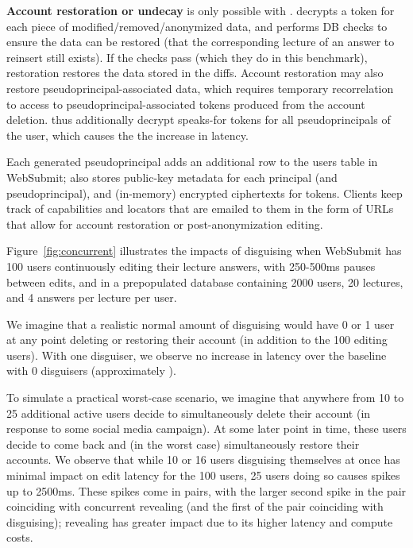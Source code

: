 \textbf{Account restoration or undecay} is only possible with \sys. \sys decrypts a token for each
piece of modified/removed/anonymized data, and performs DB checks to ensure the data can be restored
(\eg that the corresponding lecture of an answer to reinsert still exists). If the checks pass
(which they do in this benchmark), restoration restores the data stored in the diffs. Account
restoration may also restore pseudoprincipal-associated data, which requires temporary recorrelation
to access to pseudoprincipal-associated tokens produced from the account deletion.  \sys thus
additionally decrypt speaks-for tokens for all pseudoprincipals of the user, which causes the the
increase in latency.

Each generated pseudoprincipal adds an additional row to the users table in WebSubmit; \sys also
stores public-key metadata for each principal (and pseudoprincipal), and (in-memory) encrypted
ciphertexts for tokens.  Clients keep track of capabilities and locators that are emailed to them in
the form of URLs that allow for account restoration or post-anonymization editing.

 Figure~\ref{fig:concurrent} illustrates the
impacts of disguising when WebSubmit has 100 users continuously editing their lecture answers, with
250-500ms pauses between edits, and in a prepopulated database containing 2000 users, 20 lectures,
and 4 answers per lecture per user.

We imagine that a realistic normal amount of disguising would have 0 or 1 user at any point deleting
or restoring their account (in addition to the 100 editing users). With one disguiser, we observe no
increase in latency over the baseline with 0 disguisers (approximately ). 

To simulate a practical worst-case scenario, we imagine that anywhere from 10 to 25 additional
active users decide to simultaneously delete their account (\eg in response to some social media
campaign). At some later point in time, these users decide to come back and (in the worst case)
simultaneously restore their accounts. We observe that while 10 or 16 users disguising themselves at once
has minimal impact on edit latency for the 100 users, 25 users doing so causes spikes up to 2500ms.  
%
These spikes come in pairs, with the larger second spike in the pair coinciding with concurrent
revealing (and the first of the pair coinciding with disguising); revealing has greater impact due
to its higher latency and compute costs.


